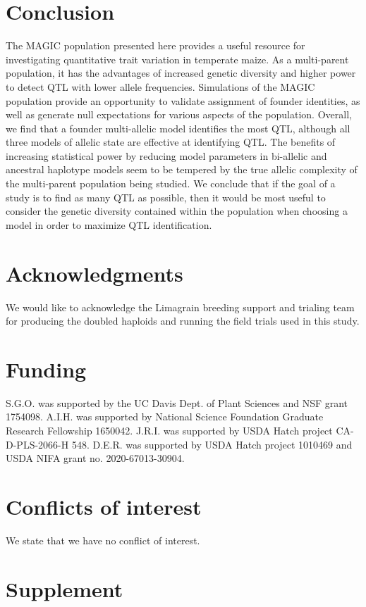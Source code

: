 \documentclass[9pt,twocolumn,twoside]{gsag3jnl}
\newcommand{\beginsupplement}{%
        \setcounter{table}{0}
        \renewcommand{\thetable}{S\arabic{table}}%
        \setcounter{figure}{0}
        \renewcommand{\thefigure}{S\arabic{figure}}%
     }
\begin{document}
\section{Conclusion}
The MAGIC population presented here provides a useful resource for investigating quantitative trait variation in temperate maize.
As a multi-parent population, it has the advantages of increased genetic diversity and higher power to detect QTL with lower allele frequencies.
Simulations of the MAGIC population provide an opportunity to validate assignment of founder identities, as well as generate null expectations for various aspects of the population.
Overall, we find that a founder multi-allelic model identifies the most QTL, although all three models of allelic state are effective at identifying QTL.
The benefits of increasing statistical power by reducing model parameters in bi-allelic and ancestral haplotype models seem to be tempered by the true allelic complexity of the multi-parent population being studied.
We conclude that if the goal of a study is to find as many QTL as possible, then it would be most useful to consider the genetic diversity contained within the population when choosing a model in order to maximize QTL identification.


\section{Acknowledgments}
We would like to acknowledge the Limagrain breeding support and trialing team for producing the doubled haploids and running the field trials used in this study.

\section{Funding}
S.G.O. was supported by the UC Davis Dept. of Plant Sciences and NSF grant 1754098. A.I.H. was supported by National Science Foundation Graduate Research Fellowship 1650042. J.R.I. was supported by USDA Hatch project CA-D-PLS-2066-H 548. D.E.R. was supported by USDA Hatch project 1010469 and USDA NIFA grant no. 2020-67013-30904.

\section{Conflicts of interest}
We state that we have no conflict of interest.


\beginsupplement
\onecolumn
\section*{Supplement}
\end{document}
